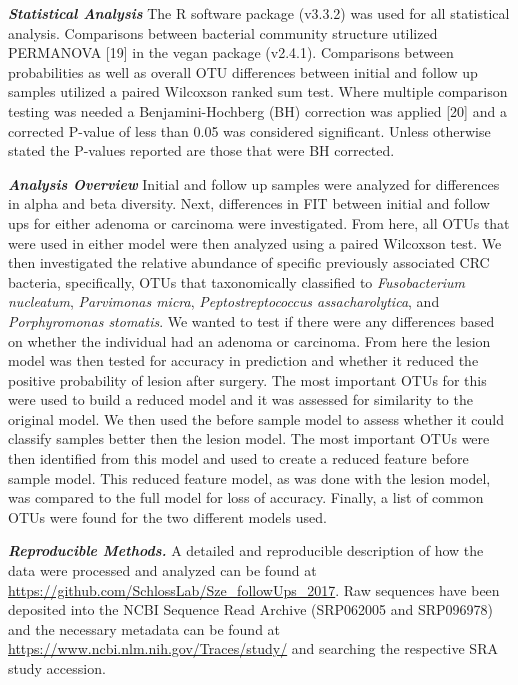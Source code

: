 \documentclass[12pt,]{article}
\begin{document}
\textbf{\emph{Statistical Analysis}} The R software package (v3.3.2) was
used for all statistical analysis. Comparisons between bacterial
community structure utilized PERMANOVA {[}19{]} in the vegan package
(v2.4.1). Comparisons between probabilities as well as overall OTU
differences between initial and follow up samples utilized a paired
Wilcoxson ranked sum test. Where multiple comparison testing was needed
a Benjamini-Hochberg (BH) correction was applied {[}20{]} and a
corrected P-value of less than 0.05 was considered significant. Unless
otherwise stated the P-values reported are those that were BH corrected.

\textbf{\emph{Analysis Overview}} Initial and follow up samples were
analyzed for differences in alpha and beta diversity. Next, differences
in FIT between initial and follow ups for either adenoma or carcinoma
were investigated. From here, all OTUs that were used in either model
were then analyzed using a paired Wilcoxson test. We then investigated
the relative abundance of specific previously associated CRC bacteria,
specifically, OTUs that taxonomically classified to \emph{Fusobacterium
nucleatum}, \emph{Parvimonas micra}, \emph{Peptostreptococcus
assacharolytica}, and \emph{Porphyromonas stomatis}. We wanted to test
if there were any differences based on whether the individual had an
adenoma or carcinoma. From here the lesion model was then tested for
accuracy in prediction and whether it reduced the positive probability
of lesion after surgery. The most important OTUs for this were used to
build a reduced model and it was assessed for similarity to the original
model. We then used the before sample model to assess whether it could
classify samples better then the lesion model. The most important OTUs
were then identified from this model and used to create a reduced
feature before sample model. This reduced feature model, as was done
with the lesion model, was compared to the full model for loss of
accuracy. Finally, a list of common OTUs were found for the two
different models used.

\textbf{\emph{Reproducible Methods.}} A detailed and reproducible
description of how the data were processed and analyzed can be found at
\url{https://github.com/SchlossLab/Sze_followUps_2017}. Raw sequences
have been deposited into the NCBI Sequence Read Archive (SRP062005 and
SRP096978) and the necessary metadata can be found at
\url{https://www.ncbi.nlm.nih.gov/Traces/study/} and searching the
respective SRA study accession.

\newpage
\end{document}
